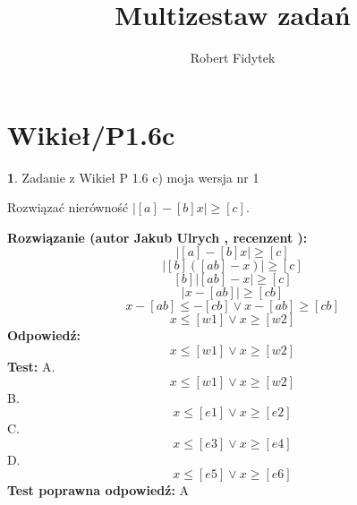 \documentclass[12pt, a4paper]{article}
\title{Multizestaw zadań}
\author{Robert Fidytek}
\date{}
\theoremstyle{definition} %
\newtheorem{zad}{}
\newcommand{\kategoria}[1]{\section{#1}} %
\newcommand{\zadStart}[1]{\begin{zad}#1\newline} %
\newcommand{\zadStop}{\end{zad}}   %
\newcommand{\rozwStart}[2]{\noindent \textbf{Rozwiązanie (autor #1 , recenzent #2): }\newline} %
\newcommand{\rozwStop}{\newline}                                            %
\newcommand{\odpStart}{\noindent \textbf{Odpowiedź:}\newline}    %
\newcommand{\odpStop}{\newline}                                             %
\newcommand{\testStart}{\noindent \textbf{Test:}\newline} %
\newcommand{\testStop}{\newline} %
\newcommand{\kluczStart}{\noindent \textbf{Test poprawna odpowiedź:}\newline} %
\newcommand{\kluczStop}{\newline} %
\begin{document}
\maketitle


\kategoria{Wikieł/P1.6c}
\zadStart{Zadanie z Wikieł P 1.6 c) moja wersja nr 1}

Rozwiązać nierówność $|[a]-[b]x|\geq[c]$.
\zadStop
\rozwStart{Jakub Ulrych}{}
$$|[a]-[b]x|\geq[c]$$ 
$$|[b]([ab]-x)|\geq[c]$$
$$[b]|[ab]-x|\geq[c]$$
$$|x-[ab]|\geq[cb]$$
$$x-[ab]\leq-[cb]\vee x-[ab]\geq[cb]$$
$$x\leq [w1]\vee x\geq [w2]$$
\rozwStop
\odpStart
$$x\leq [w1]\vee x\geq [w2]$$
\odpStop
\testStart
A.$$x\leq [w1]\vee x\geq [w2]$$
B.$$x\leq [e1]\vee x\geq [e2]$$
C.$$x\leq [e3]\vee x\geq [e4]$$
D.$$x\leq [e5]\vee x\geq [e6]$$
\testStop
\kluczStart
A
\kluczStop
\end{document}
